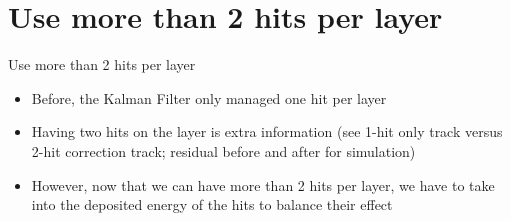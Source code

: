 \documentclass[10pt,aspectratio=43]{beamer}
\begin{document}
\section{Use more than 2 hits per layer}
\begin{frame}{Use more than 2 hits per layer}
    \begin{itemize}
        \item Before, the Kalman Filter only managed one hit per layer
        \item Having two hits on the layer is extra information (see 1-hit only track versus 2-hit correction track; residual before and after for simulation)
        \item However, now that we can have more than 2 hits per layer, we have to take into the deposited energy of the hits to balance their effect
        
    \end{itemize}
    \vspace{0.2cm}




\end{frame}
\end{document}
